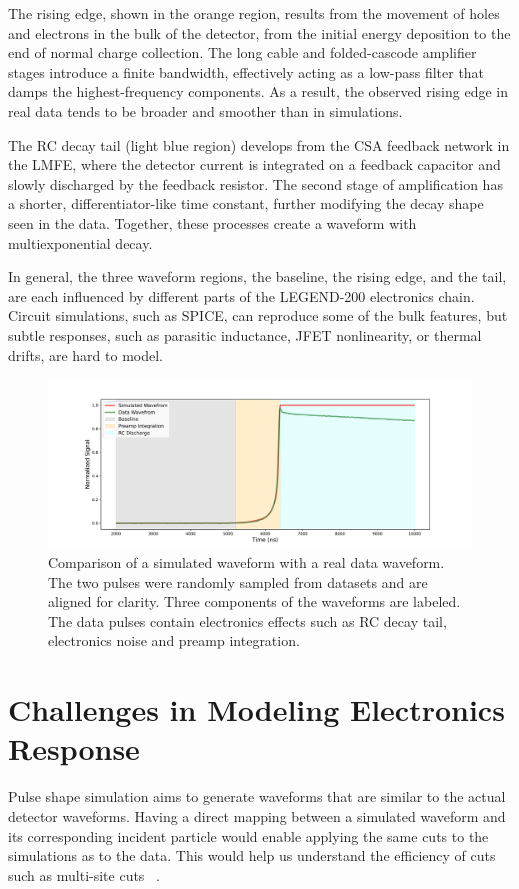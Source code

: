 The rising edge, shown in the orange region, results from the movement of holes and electrons in the bulk of the detector, from the initial energy deposition to the end of normal charge collection. The long cable and folded-cascode amplifier stages introduce a finite bandwidth, effectively acting as a low-pass filter that damps the highest-frequency components. As a result, the observed rising edge in real data tends to be broader and smoother than in simulations. 

The RC decay tail (light blue region) develops from the CSA feedback network in the LMFE, where the detector current is integrated on a feedback capacitor and slowly discharged by the feedback resistor. The second stage of amplification has a shorter, differentiator-like time constant, further modifying the decay shape seen in the data. Together, these processes create a waveform with multiexponential decay. 

In general, the three waveform regions, the baseline, the rising edge, and the tail, are each influenced by different parts of the LEGEND-200 electronics chain. Circuit simulations, such as SPICE, can reproduce some of the bulk features, but subtle responses, such as parasitic inductance, JFET nonlinearity, or thermal drifts, are hard to model.

\begin{figure}[!htb]%
    \includegraphics[width=\linewidth,trim={2.5cm 0pc 3.5cm 0pc},clip]{ch6/figs/wf_comp_sim_data.pdf}
    \caption{Comparison of a simulated waveform with a real data waveform. The two pulses were randomly sampled from datasets and are aligned for clarity. Three components of the waveforms are labeled. The data pulses contain electronics effects such as RC decay tail, electronics noise and preamp integration.}
    \label{fig:sim_data_comp}
\end{figure}

\section{Challenges in Modeling Electronics Response}
Pulse shape simulation aims to generate waveforms that are similar to the actual detector waveforms. Having a direct mapping between a simulated waveform and its corresponding incident particle would enable applying the same cuts to the simulations as to the data. This would help us understand the efficiency of cuts such as multi-site cuts ~\cite{AvsE}.  

